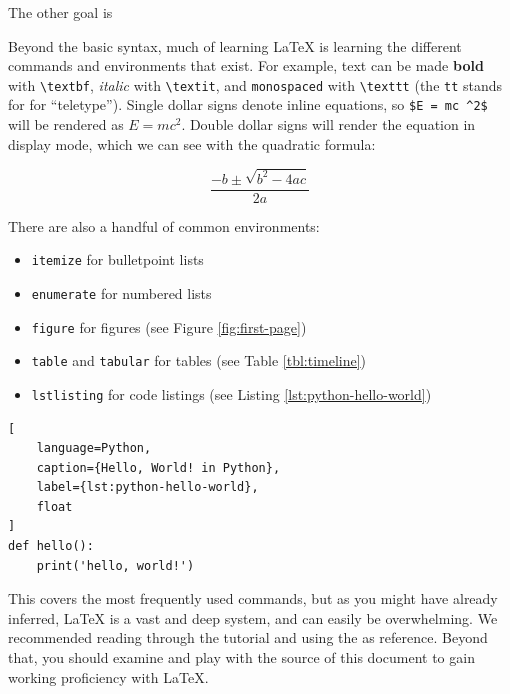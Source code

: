 \documentclass[10pt,twocolumn]{article}
\begin{document}
The other goal is


Beyond the basic syntax, much of learning LaTeX is learning the different commands and environments that exist.
For example, text can be made \textbf{bold} with \texttt{\textbackslash textbf}, \textit{italic} with \texttt{\textbackslash textit}, and \texttt{monospaced} with \texttt{\textbackslash texttt} (the \texttt{tt} stands for for ``teletype'').
Single dollar signs denote inline equations, so \texttt{\$E = mc \textasciicircum 2\$} will be rendered as $E = mc^2$.
Double dollar signs will render the equation in display mode, which we can see with the quadratic formula:

$$\frac{{-b \pm \sqrt {b^2 - 4ac} }}{{2a}}$$

There are also a handful of common environments:

\begin{itemize}
    \item \texttt{itemize} for bulletpoint lists
    \item \texttt{enumerate} for numbered lists
    \item \texttt{figure} for figures (see Figure \ref{fig:first-page})
    \item \texttt{table} and \texttt{tabular} for tables (see Table \ref{tbl:timeline})
    \item \texttt{lstlisting} for code listings (see Listing \ref{lst:python-hello-world})
\end{itemize}

\begin{lstlisting}[
    language=Python,
    caption={Hello, World! in Python},
    label={lst:python-hello-world},
    float
]
def hello():
    print('hello, world!')
\end{lstlisting}

This covers the most frequently used commands, but as you might have already inferred, LaTeX is a vast and deep system, and can easily be overwhelming.
We recommended reading through the  tutorial \cite{Overleaf2021LearnLaTeXIn} and using the  \cite{WikiBook2022LaTeX} as reference.
Beyond that, you should examine and play with the source of this document to gain working proficiency with LaTeX.
\end{document}

